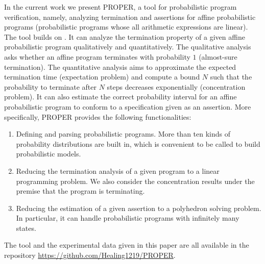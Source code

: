 \documentclass[sigconf,review, anonymous]{acmart}
\begin{document}
In the current work we present PROPER, a tool for probabilistic program verification, namely, analyzing termination and assertions for affine probabilistic programs (probabilistic programs whose all arithmetic expressions are linear).
The tool builds on \cite{cha2015algorithmic,kris2016termination,Sankaranarayanan2013Static}.
It can analyze the termination property of a given affine probabilistic program qualitatively and quantitatively. The qualitative analysis asks whether an affine program terminates with probability $1$ (almost-sure termination). The quantitative analysis  aims to approximate the expected termination time (expectation problem) and compute a bound $N$ such that the probability to terminate after $N$ steps decreases exponentially (concentration problem).
It can also estimate the correct probability interval for an affine  probabilistic program to conform to a specification given as an assertion.
More specifically, PROPER provides the following functionalities:
\begin{enumerate}
	\item Defining and parsing probabilistic programs. More than ten kinds of probability distributions are built in, which is convenient to be called to build probabilistic models.
    \item Reducing the termination analysis of a given program to a linear programming problem. We also consider the concentration results under the premise that the program is terminating.
	\item Reducing the estimation of a given assertion to a polyhedron solving problem. In particular, it can handle probabilistic programs with infinitely many states.	
\end{enumerate}
The tool and the experimental data given in this paper are all available in the repository \url{https://github.com/Healing1219/PROPER}.
\end{document}
